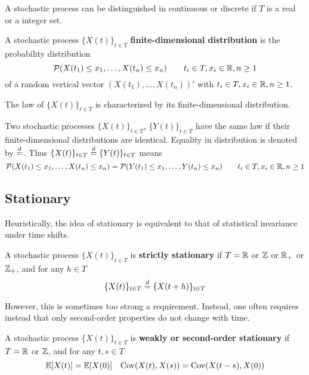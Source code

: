 A stochastic process can be distinguished in continuous or discrete if $T$ is a real or a integer set.

\begin{definition}
	A stochastic process $\{X(t)\}_{t \in T}$ \textbf{finite-dimensional distribution} is the probability distribution
	\begin{equation}
		\mathcal{P}(X(t_1) \le x_1, \dots, X(t_n) \le x_n) \qquad t_i \in T, x_i \in \mathbb{R}, n \ge 1
	\end{equation} 
	of a random vertical vector $(X(t_1), \dots, X(t_n))'$ with $t_i \in T, x_i \in \mathbb{R}, n \ge 1$. 
\end{definition}

The law of $\{X(t)\}_{t \in T}$ is characterized by its finite-dimensional distribution.

Two stochastic processes $\{X(t)\}_{t \in T}$, $\{Y(t)\}_{t \in T}$ have the same law if their finite-dimensional distributions are identical. Equality in distribution is denoted by $\overset{d}{=}$. Thus $\{X(t)\}_{t \in T} \overset{d}{=} \{Y(t)\}_{t \in T}$ means
\begin{equation}
	\mathcal{P}(X(t_1) \le x_1, \dots, X(t_n) \le x_n) = \mathcal{P}(Y(t_1) \le x_1, \dots, Y(t_n) \le x_n) \qquad t_i \in T, x_i \in \mathbb{R}, n \ge 1
\end{equation} 

\subsection{Stationary}
Heuristically, the idea of stationary is equivalent to that of statistical invariance under time shifts.
\begin{definition}\label{def:strictstationary} 
	A stochastic process $\{X (t)\}_{t \in T}$ is \textbf{strictly stationary} if $T = \mathbb{R}$ or $\mathbb{Z}$ or $\mathbb{R}_+$ or $\mathbb{Z}_+$, and for any $h \in T$
	\begin{equation}
		\{X(t)\}_{t \in T} \overset{d}{=} \{X(t + h)\}_{t \in T} 
	\end{equation}
\end{definition}

However, this is sometimes too strong a requirement. Instead, one often requires instead that only second-order properties do not change with time.
\begin{definition}
	A stochastic process $\{X (t)\}_{t \in T}$ is \textbf{weakly or second-order stationary} if $T = \mathbb{R}$ or $\mathbb{Z}$, and for any $t, s \in T$
	\begin{equation}
		\mathbb{E}[X(t)] = \mathbb{E}[X(0)] \quad \textnormal{Cov}(X(t), X(s)) = \textnormal{Cov}(X(t-s), X(0))
	\end{equation}
\end{definition}

